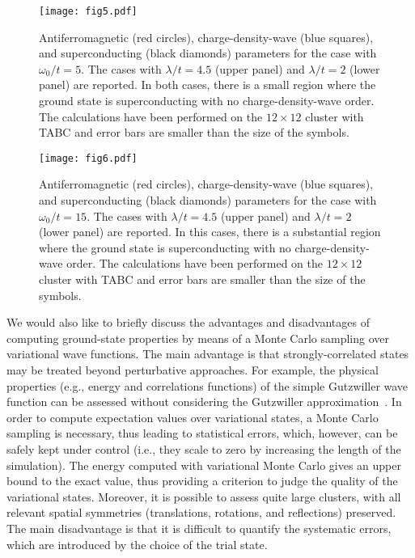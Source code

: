 \documentclass[aps,superscriptaddress,amsmath,amssymb,twocolumn,showpacs,floatfix,english]{revtex4}
\begin{document}
\begin{figure}
\texttt{[image: fig5.pdf]}
\caption{\label{fig:paramw5}
Antiferromagnetic (red circles), charge-density-wave (blue squares), and superconducting (black diamonds) parameters for the case with 
$\omega_0/t=5$. The cases with $\lambda/t=4.5$ (upper panel) and $\lambda/t=2$ (lower panel) are reported. In both cases, there is a small 
region where the ground state is superconducting with no charge-density-wave order. The calculations have been performed on the $12 \times 12$ 
cluster with TABC and error bars are smaller than the size of the symbols.}
\end{figure}

\begin{figure}
\texttt{[image: fig6.pdf]}
\caption{\label{fig:paramw15}
Antiferromagnetic (red circles), charge-density-wave (blue squares), and superconducting (black diamonds) parameters for the case with 
$\omega_0/t=15$. The cases with $\lambda/t=4.5$ (upper panel) and $\lambda/t=2$ (lower panel) are reported. In this cases, there is a 
substantial region where the ground state is superconducting with no charge-density-wave order. The calculations have been performed on 
the $12 \times 12$ cluster with TABC and error bars are smaller than the size of the symbols.}
\end{figure}

We would also like to briefly discuss the advantages and disadvantages of computing ground-state properties by means of a Monte Carlo sampling 
over variational wave functions. The main advantage is that strongly-correlated states may be treated beyond perturbative approaches. For 
example, the physical properties (e.g., energy and correlations functions) of the simple Gutzwiller wave function can be assessed without 
considering the Gutzwiller approximation~\cite{Brinkman1970,Vollhardt1984}. In order to compute expectation values over variational states, 
a Monte Carlo sampling is necessary, thus leading to statistical errors, which, however, can be safely kept under control (i.e., they scale to 
zero by increasing the length of the simulation). The energy computed with variational Monte Carlo gives an upper bound to the exact value, 
thus providing a criterion to judge the quality of the variational states. Moreover, it is possible to assess quite large clusters, with all 
relevant spatial symmetries (translations, rotations, and reflections) preserved. The main disadvantage is that it is difficult to quantify 
the systematic errors, which are introduced by the choice of the trial state.
\end{document}
